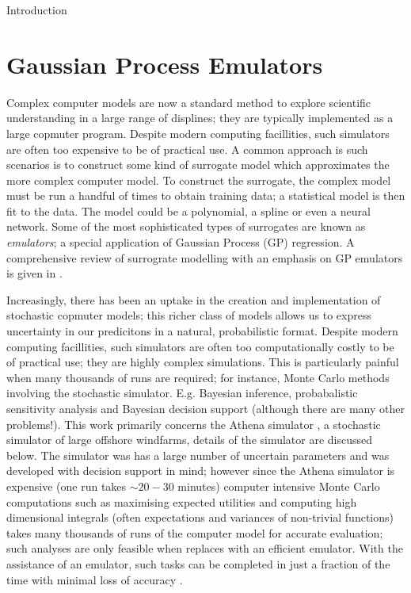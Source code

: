 \begin{chapter}{Introduction \label{Ch:Intro}}
\section{Gaussian Process Emulators}

Complex computer models are now a standard method to explore scientific understanding in a large range of displines; they are typically implemented as a large copmuter program. Despite modern computing facillities, such simulators are often too expensive to be of practical use. A common approach is such scenarios is to construct some kind of surrogate model which approximates the more complex computer model. To construct the surrogate, the complex model must be run a handful of times to obtain training data; a statistical model is then fit to the data. The model could be a polynomial, a spline or even a neural network. Some of the most sophisticated types of surrogates are known as \textit{emulators}; a special application of Gaussian Process (GP) regression. A comprehensive review of surrograte modelling with an emphasis on GP emulators is given in \citet{Gramacy2020surrogates}.

Increasingly, there has been an uptake in the creation and implementation of stochastic copmuter models; this richer class of models allows us to express uncertainty in our predicitons in a natural, probabilistic format. Despite modern computing facillities, such simulators are often too computationally costly to be of practical use; they are highly complex simulations. This is particularly painful when many thousands of runs are required; for instance, Monte Carlo methods involving the stochastic simulator. E.g. Bayesian inference, probabalistic sensitivity analysis and Bayesian decision support (although there are many other problems!). This work primarily concerns the Athena simulator \citep{Zit13, Zit16}, a stochastic simulator of large offshore windfarms, details of the simulator are discussed below. The simulator was has a large number of uncertain parameters and was developed with decision support in mind; however since the Athena simulator is expensive (one run takes $\sim 20 - 30$ minutes) computer intensive Monte Carlo computations such as maximising expected utilities and computing high dimensional integrals (often expectations and variances of non-trivial functions) takes many thousands of runs of the computer model for accurate evaluation; such analyses are only feasible when replaces with an efficient emulator. With the assistance of an emulator, such tasks can be completed in just a fraction of the time with minimal loss of accuracy \citep{Ohagan01, Oakley04, Ohagan2006}.


\end{chapter}
